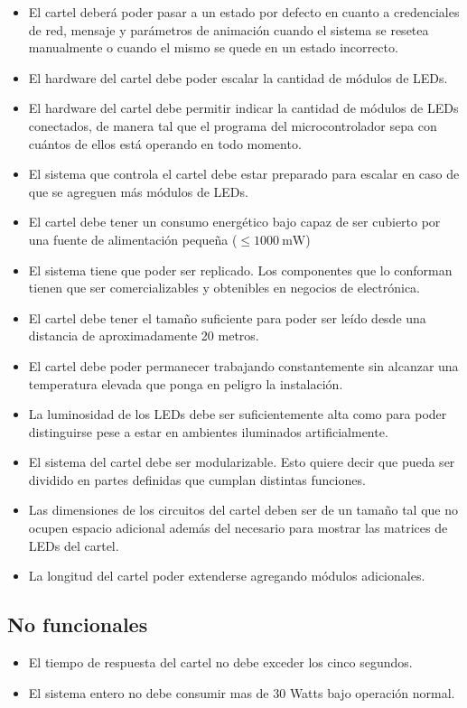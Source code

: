 \begin{itemize}
	\item El cartel deberá poder pasar a un estado por defecto en cuanto a credenciales de red, mensaje y parámetros de animación cuando el sistema se resetea manualmente o cuando el mismo se quede en un estado incorrecto.
	\item El hardware del cartel debe poder escalar la cantidad de módulos de LEDs.
	\item El hardware del cartel debe permitir indicar la cantidad de módulos de LEDs conectados, de manera tal que el programa del microcontrolador sepa con cuántos de ellos está operando en todo momento.
	\item El sistema que controla el cartel debe estar preparado para escalar en caso de que se agreguen más módulos de LEDs.
	\item El cartel debe tener un consumo energético bajo capaz de ser cubierto por una fuente de alimentación pequeña ($\le 1000\ \mbox{mW}$)
	\item El sistema tiene que poder ser replicado. Los componentes que lo conforman tienen que ser comercializables y obtenibles en negocios de electrónica.
	\item El cartel debe tener el tamaño suficiente para poder ser leído desde una distancia de aproximadamente 20 metros.
	\item El cartel debe poder permanecer trabajando constantemente sin alcanzar una temperatura elevada que ponga en peligro la instalación.
	\item La luminosidad de los LEDs debe ser suficientemente alta como para poder distinguirse pese a estar en ambientes iluminados artificialmente.
	\item El sistema del cartel debe ser modularizable. Esto quiere decir que pueda ser dividido en partes definidas que cumplan distintas funciones.
	\item Las dimensiones de los circuitos del cartel deben ser de un tamaño tal que no ocupen espacio adicional además del necesario para mostrar las matrices de LEDs del cartel.
	\item La longitud del cartel poder extenderse agregando módulos adicionales.
\end{itemize}

\subsection{No funcionales}
\begin{itemize}
	\item El tiempo de respuesta del cartel no debe exceder los cinco segundos.
	\item El sistema entero no debe consumir mas de 30 Watts bajo operación normal.
\end{itemize}

